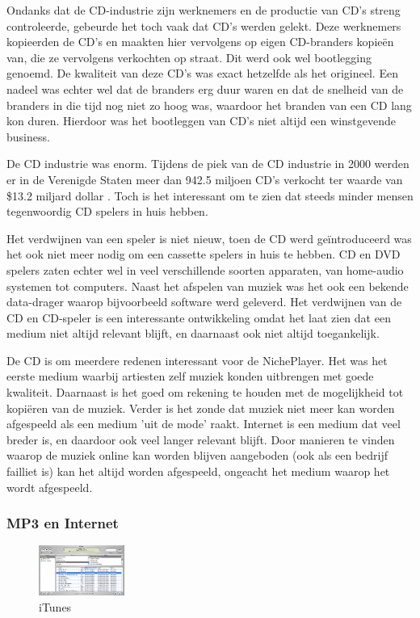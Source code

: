 Ondanks dat de CD-industrie zijn werknemers en de productie van CD's streng controleerde, gebeurde het toch vaak dat CD's werden gelekt. Deze werknemers kopieerden de CD's en maakten hier vervolgens op eigen CD-branders kopieën van, die ze vervolgens verkochten op straat. Dit werd ook wel bootlegging genoemd. De kwaliteit van deze CD's was exact hetzelfde als het origineel. Een nadeel was echter wel dat de branders erg duur waren en dat de snelheid van de branders in die tijd nog niet zo hoog was, waardoor het branden van een CD lang kon duren. Hierdoor was het bootleggen van CD's niet altijd een winstgevende business.

De CD industrie was enorm. Tijdens de piek van de CD industrie in 2000 werden er in de Verenigde Staten meer dan 942.5 miljoen CD's verkocht ter waarde van \$13.2 miljard dollar \citep{riaa2022salesdatabase}. Toch is het interessant om te zien dat steeds minder mensen tegenwoordig CD spelers in huis hebben.

Het verdwijnen van een speler is niet nieuw, toen de CD werd geïntroduceerd was het ook niet meer nodig om een cassette spelers in huis te hebben. CD en DVD spelers zaten echter wel in veel verschillende soorten apparaten, van home-audio systemen tot computers. Naast het afspelen van muziek was het ook een bekende data-drager waarop bijvoorbeeld software werd geleverd. Het verdwijnen van de CD en CD-speler is een interessante ontwikkeling omdat het laat zien dat een medium niet altijd relevant blijft, en daarnaast ook niet altijd toegankelijk.

De CD is om meerdere redenen interessant voor de NichePlayer. Het was het eerste medium waarbij artiesten zelf muziek konden uitbrengen met goede kwaliteit. Daarnaast is het goed om rekening te houden met de mogelijkheid tot kopiëren van de muziek. Verder is het zonde dat muziek niet meer kan worden afgespeeld als een medium 'uit de mode' raakt. Internet is een medium dat veel breder is, en daardoor ook veel langer relevant blijft. Door manieren te vinden waarop de muziek online kan worden blijven aangeboden (ook als een bedrijf failliet is) kan het altijd worden afgespeeld, ongeacht het medium waarop het wordt afgespeeld.

\subsubsection*{MP3 en Internet}
\begin{figure}
    \centering
    \includegraphics[width=0.25\textwidth]{assets/critical-review/iTunes_v1.jpeg}
    \caption{iTunes}
    \label{fig:critical-review:iTunes}
\end{figure}

